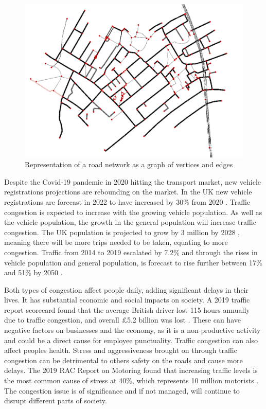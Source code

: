 \documentclass[11pt]{report}
\begin{document}
\begin{figure}[h!]
  \centering
  \includegraphics[width=0.75\linewidth]{graphRoadNetwork.PNG}
  \caption{Representation of a road network as a graph of vertices and edges}
  \label{fig:2}
\end{figure}

Despite the Covid-19 pandemic in 2020 hitting the transport market, new vehicle registrations projections are rebounding on the market. In the UK new vehicle registrations are forecast in 2022 to have increased by 30\%  from 2020 \autocite{smmtnewCars}. Traffic congestion is expected to increase with the growing vehicle population. As well as the vehicle population, the growth in the general population will increase traffic congestion. The UK population is projected to grow by 3 million by 2028 \autocite{nashnational}, meaning there will be more trips needed to be taken, equating to more congestion. Traffic from 2014 to 2019 escalated by 7.2\% \autocite{dotRoadEstimates} and through the rises in vehicle population and general population, is forecast to rise further between 17\% and 51\% by 2050 \autocite{roadtrafficforecasts}.

Both types of congestion affect people daily, adding significant delays in their lives. It has substantial economic and social impacts on society. A 2019 traffic report scorecard found that the average British driver lost 115 hours annually due to traffic congestion, and overall £5.2 billion was lost \autocite{reed2019inrix}. These can have negative factors on businesses and the economy, as it is a non-productive activity and could be a direct cause for employee punctuality. Traffic congestion can also affect peoples health. Stress and aggressiveness brought on through traffic congestion can be detrimental to others safety on the roads and cause more delays. The 2019 RAC Report on Motoring found that increasing traffic levels is the most common cause of stress at 40\%, which represents 10 million motorists \autocite{racreportonmotoring}. The congestion issue is of significance and if not managed, will continue to disrupt different parts of society. 
\end{document}
